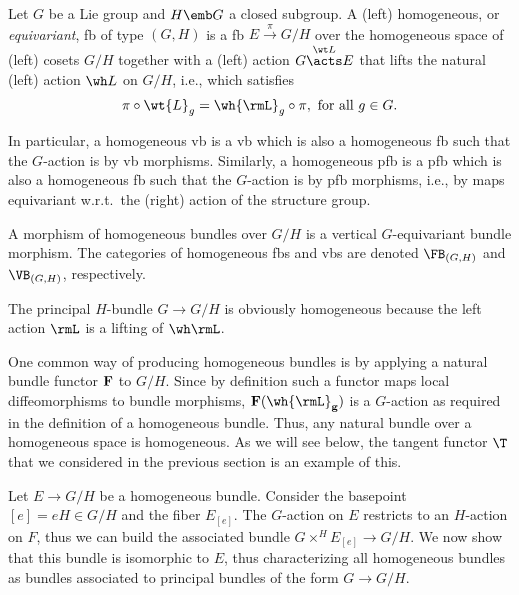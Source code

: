 \begin{defn}
    Let $G$ be a Lie group and $H\emb G$ a closed subgroup. A (left) homogeneous, or \emph{equivariant}, \gls{fb} of type $(G,H)$ is a \gls{fb} $E\overset{\pi}{\to}G\slash H$ over the homogeneous space of (left) cosets $G\slash H$ together with a (left) action $G\overset{\wt L}{\acts} E$ that lifts the natural (left) action $\wh L$ on $G\slash H$, i.e., which satisfies \[\pi\circ \wt{L}_g=\wh{\rmL}_g\circ \pi,\text{ for all } g\in G.\] 

    In particular, a homogeneous \gls{vb} is a \gls{vb} which is also a homogeneous \gls{fb} such that the $G$-action is by \gls{vb} morphisms. Similarly, a homogeneous \gls{pfb} is a \gls{pfb} which is also a homogeneous \gls{fb} such that the $G$-action is by \gls{pfb} morphisms, i.e., by maps equivariant w.r.t.\ the (right) action of the structure group.

    A morphism of homogeneous bundles over $G\slash H$ is a vertical $G$-equivariant bundle morphism. The categories of homogeneous \glspl{fb} and \glspl{vb} are denoted $\FB_{(G,H)}$ and $\VB_{(G,H)}$, respectively. 
\end{defn}

\begin{example}
    The principal $H$-bundle $G\to G\slash H$ is obviously homogeneous because the left action $\rmL$ is a lifting of $\wh \rmL$.
\end{example}

One common way of producing homogeneous bundles is by applying a natural bundle functor $\bf{F}$ to $G\slash H$. Since by definition such a functor maps local diffeomorphisms to bundle morphisms, $\bf{F}(\wh{\rmL}_g)$ is a $G$-action as required in the definition of a homogeneous bundle. Thus, any natural bundle over a homogeneous space is homogeneous. As we will see below, the tangent functor $\T$ that we considered in the previous section is an example of this.

Let $E\to G\slash H$ be a homogeneous bundle. Consider the basepoint $[e]=eH\in G\slash H$ and the fiber $E_{[e]}$. The $G$-action on $E$ restricts to an $H$-action on $F$, thus we can build the associated bundle $G\times^H E_{[e]}\to G\slash H$. We now show that this bundle is isomorphic to $E$, thus characterizing all homogeneous bundles as bundles associated to principal bundles of the form $G\to G\slash H$.

